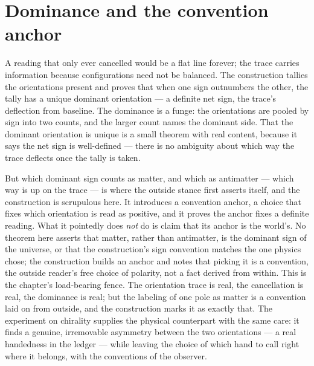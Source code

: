 \section{Dominance and the convention anchor}
\label{se:dominance-and-the-convention-anchor}

A reading that only ever cancelled would be a flat line forever; the trace carries information because
configurations need not be balanced. The construction tallies the orientations present and proves that
when one sign outnumbers the other, the tally has a unique dominant orientation --- a definite net sign,
the trace's deflection from baseline. The dominance is a funge: the orientations are pooled by sign into
two counts, and the larger count names the dominant side. That the dominant orientation is unique is a
small theorem with real content, because it says the net sign is well-defined --- there is no ambiguity
about which way the trace deflects once the tally is taken.

But which dominant sign counts as matter, and which as antimatter --- which way is up on the trace --- is
where the outside stance first asserts itself, and the construction is scrupulous here. It introduces a
convention anchor, a choice that fixes which orientation is read as positive, and it proves the anchor
fixes a definite reading. What it pointedly does \emph{not} do is claim that its anchor is the world's. No
theorem here asserts that matter, rather than antimatter, is the dominant sign of the universe, or that
the construction's sign convention matches the one physics chose; the construction builds an anchor and
notes that picking it is a convention, the outside reader's free choice of polarity, not a fact derived
from within. This is the chapter's load-bearing fence. The orientation trace is real, the cancellation is
real, the dominance is real; but the labeling of one pole as matter is a convention laid on from outside,
and the construction marks it as exactly that. The experiment on chirality supplies the physical
counterpart with the same care: it finds a genuine, irremovable asymmetry between the two orientations ---
a real handedness in the ledger --- while leaving the choice of which hand to call right where it belongs,
with the conventions of the observer.

